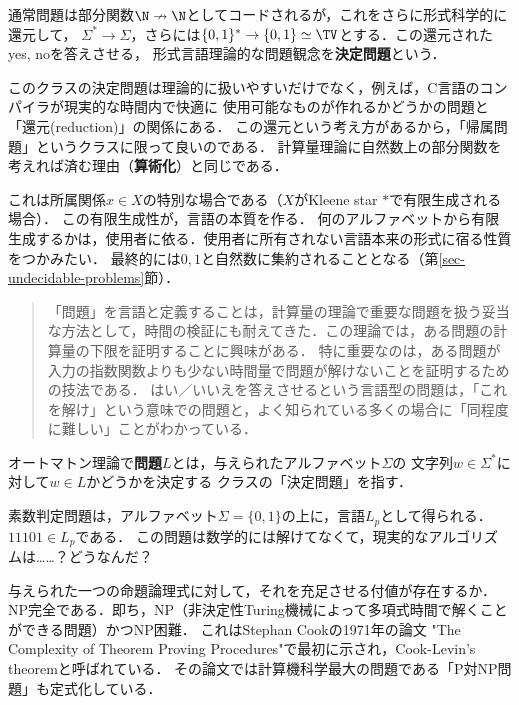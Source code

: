 \begin{tcolorbox}[colframe=ForestGreen, colback=ForestGreen!10!white, breakable]
    通常問題は部分関数$\N\nrightarrow\N$としてコードされるが，これをさらに形式科学的に還元して，
    $\Sigma^*\to\Sigma$，さらには$\{0,1\}^*\to\{0,1\}\simeq\TV$とする．この還元されたyes, noを答えさせる，
    形式言語理論的な問題観念を\textbf{決定問題}という．

    このクラスの決定問題は理論的に扱いやすいだけでなく，例えば，C言語のコンパイラが現実的な時間内で快適に
    使用可能なものが作れるかどうかの問題と「還元(reduction)」の関係にある．
    この還元という考え方があるから，「帰属問題」というクラスに限って良いのである．
    計算量理論に自然数上の部分関数を考えれば済む理由（\textbf{算術化}）と同じである．

    これは所属関係$x\in X$の特別な場合である（$X$がKleene star $*$で有限生成される場合）．
    この有限生成性が，言語の本質を作る．
    何のアルファベットから有限生成するかは，使用者に依る．使用者に所有されない言語本来の形式に宿る性質をつかみたい．
    最終的には$0,1$と自然数に集約されることとなる（第\ref{sec-undecidable-problems}節）．
    \begin{quotation}
        「問題」を言語と定義することは，計算量の理論で重要な問題を扱う妥当な方法として，時間の検証にも耐えてきた．この理論では，ある問題の計算量の下限を証明することに興味がある．
        特に重要なのは，ある問題が入力の指数関数よりも少ない時間量で問題が解けないことを証明するための技法である．
        はい／いいえを答えさせるという言語型の問題は，「これを解け」という意味での問題と，よく知られている多くの場合に「同程度に難しい」ことがわかっている．
    \end{quotation}
\end{tcolorbox}

\begin{definition}[problem]
    オートマトン理論で\textbf{問題}$L$とは，与えられたアルファベット$\Sigma$の
    文字列$w\in\Sigma^*$に対して$w\in L$かどうかを決定する
    クラスの「決定問題」を指す．
\end{definition}

\begin{example}[素数判定問題]\label{problem-素数判定問題}
    素数判定問題は，アルファベット$\Sigma=\{0,1\}$の上に，言語$L_p$として得られる．$11101\in L_p$である．
    この問題は数学的には解けてなくて，現実的なアルゴリズムは……？どうなんだ？
\end{example}

\begin{example}\label{problem-SAT}
    与えられた一つの命題論理式に対して，それを充足させる付値が存在するか．
    NP完全である．即ち，NP（非決定性Turing機械によって多項式時間で解くことができる問題）かつNP困難．
    これはStephan Cookの1971年の論文 "The Complexity of Theorem Proving Procedures"で最初に示され，Cook-Levin's theoremと呼ばれている．
    その論文では計算機科学最大の問題である「P対NP問題」も定式化している．
\end{example}

